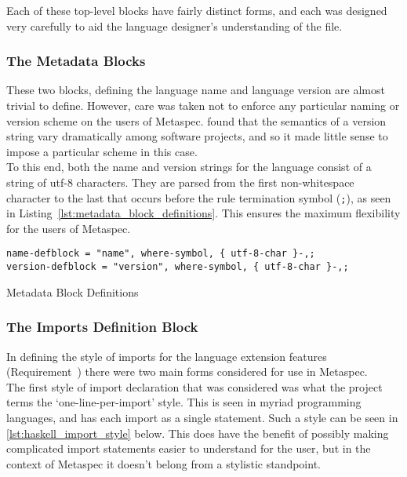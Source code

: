 Each of these top-level blocks have fairly distinct forms, and each was designed very carefully to aid the language designer's understanding of the file.

\subsubsection{The Metadata Blocks} %
\label{ssub:the_metadata_blocks}
These two blocks, defining the language name and language version are almost trivial to define. 
However, care was taken not to enforce any particular naming or version scheme on the users of Metaspec.
\citet{raemaekers2014semantic} found that the semantics of a version string vary dramatically among software projects, and so it made little sense to impose a particular scheme in this case. \\

To this end, both the name and version strings for the language consist of a string of utf-8 characters.
They are parsed from the first non-whitespace character to the last that occurs before the rule termination symbol (\texttt{;}), as seen in Listing~\ref{lst:metadata_block_definitions}.
This ensures the maximum flexibility for the users of Metaspec. 

\begin{listing}[!htb]
\begin{verbatim}
name-defblock = "name", where-symbol, { utf-8-char }-,;
version-defblock = "version", where-symbol, { utf-8-char }-,;
\end{verbatim}
\caption{Metadata Block Definitions}
\label{lst:metadata_block_definitions}
\end{listing}


\subsubsection{The Imports Definition Block} %
\label{ssub:the_imports_definition_block}
In defining the style of imports for the language extension features (Requirement~) there were two main forms considered for use in Metaspec.\\

The first style of import declaration that was considered was what the project terms the `one-line-per-import' style. 
This is seen in myriad programming languages, and has each import as a single statement. 
Such a style can be seen in \autoref{lst:haskell_import_style} below.
This does have the benefit of possibly making complicated import statements easier to understand for the user, but in the context of Metaspec it doesn't belong from a stylistic standpoint.

